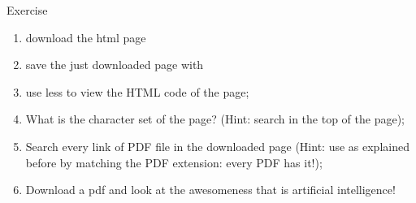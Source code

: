 \begin{frame}{Exercise}
	\begin{enumerate}
		\item<1-> download the html page 
		\item<2-> save the just downloaded page with 
		\item<3-> use less to view the HTML code of the page;
		\item<4-> What is the character set of the page? (Hint: search  in the top of the page);
		\item<5-> Search every link of PDF file in the downloaded page (Hint: use  as explained before by matching the PDF extension: every PDF has it!);
		\item<6-> Download a pdf and look at the awesomeness that is artificial intelligence!
	\end{enumerate}
\end{frame}

